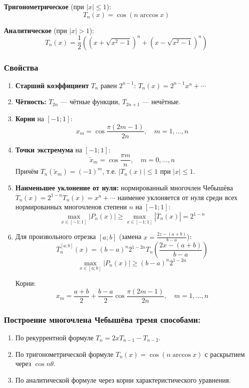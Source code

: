 \documentclass[14pt,a4paper]{extarticle}
\begin{document}
\textbf{Тригонометрическое} (при $|x| \leq 1$):
\[T_n(x) = \cos(n \arccos x)\]

\textbf{Аналитическое} (при $|x| > 1$):
\[T_n(x) = \frac{1}{2}\left(\left(x + \sqrt{x^2 - 1}\right)^n + \left(x - \sqrt{x^2 - 1}\right)^n\right)\]

\subsubsection{Свойства}

\begin{enumerate}
    \item \textbf{Старший коэффициент} $T_n$ равен $2^{n-1}$: $T_n(x) = 2^{n-1}x^n + \cdots$

    \item \textbf{Чётность:} $T_{2n}$ --- чётные функции, $T_{2n+1}$ --- нечётные.

    \item \textbf{Корни} на $[-1; 1]$:
    \[x_m = \cos\frac{\pi(2m - 1)}{2n}, \quad m = 1, \ldots, n\]

    \item \textbf{Точки экстремума} на $[-1; 1]$:
    \[\tilde{x}_m = \cos\frac{\pi m}{n}, \quad m = 0, \ldots, n\]
    Причём $T_n(\tilde{x}_m) = (-1)^m$, т.е. $|T_n(x)| \leq 1$ при $|x| \leq 1$.

    \item \textbf{Наименьшее уклонение от нуля:} нормированный многочлен Чебышёва $\overline{T}_n(x) = 2^{1-n} T_n(x) = x^n + \cdots$ наименее уклоняется от нуля среди всех нормированных многочленов степени $n$ на $[-1; 1]$:
    \[\max_{x \in [-1; 1]} |P_n(x)| \geq \max_{x \in [-1; 1]} |\overline{T}_n(x)| = 2^{1-n}\]

    \item Для произвольного отрезка $[a; b]$ (замена $x = \frac{2z - (a+b)}{b-a}$):
    \[\overline{T}_n^{[a; b]}(x) = (b-a)^n 2^{1-2n} T_n\!\left(\frac{2x - (a + b)}{b - a}\right)\]
    \[\max_{x \in [a; b]} |P_n(x)| \geq (b-a)^n 2^{1-2n}\]

    Корни:
    \[x_m = \frac{a + b}{2} + \frac{b - a}{2} \cos\frac{\pi(2m - 1)}{2n}, \quad m = 1, \ldots, n\]
\end{enumerate}

\subsubsection{Построение многочлена Чебышёва тремя способами:}
\begin{enumerate}
    \item По рекуррентной формуле $T_n = 2x T_{n-1} - T_{n-2}$.
    \item По тригонометрической формуле $T_n(x) = \cos(n \arccos x)$ с раскрытием через $\cos n\theta$.
    \item По аналитической формуле через корни характеристического уравнения.
\end{enumerate}
\end{document}
